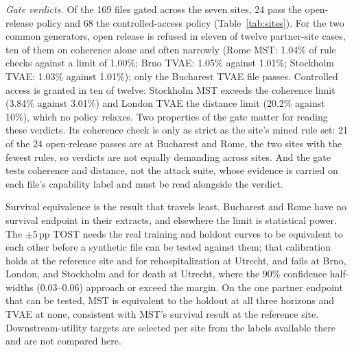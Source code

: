 \documentclass[11pt,a4paper]{article}
\begin{document}
\emph{Gate verdicts.} Of the 169 files gated across the seven sites, 24 pass the
open-release policy and 68 the controlled-access policy
(Table~\ref{tab:sites}). For the two common generators, open release is refused
in eleven of twelve partner-site cases, ten of them on coherence alone and
often narrowly (Rome MST: 1.04\% of rule checks against a limit of
1.00\%; Brno TVAE: 1.05\% against 1.01\%; Stockholm TVAE: 1.03\% against
1.01\%); only the Bucharest TVAE file passes. Controlled access is granted in ten
of twelve: Stockholm MST exceeds the coherence limit (3.84\% against 3.01\%) and
London TVAE the distance limit (20.2\% against 10\%), which no policy relaxes.
Two properties of the gate matter for reading these verdicts. Its coherence
check is only as strict as the site's mined rule set: 21 of the 24 open-release
passes are at Bucharest and Rome, the two sites with the fewest rules, so
verdicts are not equally demanding across sites. And the gate tests coherence
and distance, not the attack suite, whose evidence is carried on each file's
capability label and must be read alongside the verdict.

Survival equivalence is the result that travels least. Bucharest and Rome have no
survival endpoint in their extracts, and elsewhere the limit is statistical
power. The $\pm 5$\,pp TOST needs the real training and holdout curves to be
equivalent to each other before a synthetic file can be tested against them;
that calibration holds at the reference site and for rehospitalization at
Utrecht, and fails at Brno, London, and Stockholm and for death at Utrecht,
where the 90\% confidence half-widths (0.03--0.06) approach or exceed the margin.
On the one partner endpoint that can be tested, MST is equivalent to the holdout
at all three horizons and TVAE at none, consistent with MST's survival result at
the reference site. Downstream-utility targets are selected per site from the
labels available there and are not compared here.
\end{document}
